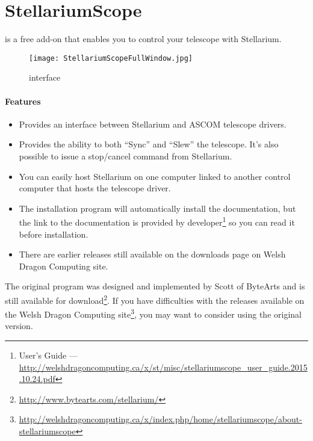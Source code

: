 


\newpage
\section{StellariumScope}
\label{sec:plugins:StellariumScope}
 is a free add-on that enables you to control your telescope with Stellarium. 

\begin{figure}[htp]
\begin{center}
\texttt{[image: StellariumScopeFullWindow.jpg]}
\end{center}
\caption{ interface}
\label{fig:StellariumScopeFullWindow}
\end{figure}


\paragraph{Features}
\begin{itemize}
\item Provides an interface between Stellarium and ASCOM telescope drivers.
\item Provides the ability to both ``Sync'' and ``Slew'' the
  telescope. It's also possible to issue a stop/cancel command from
  Stellarium.
\item You can easily host Stellarium on one computer linked to another
  control computer that hosts the telescope driver.
\item The installation program will automatically install the
  documentation, but the link to the documentation is provided
  by developer\footnote{ User's Guide --- \url{http://welshdragoncomputing.ca/x/st/misc/stellariumscope_user_guide.2015.10.24.pdf}} so you can read it before installation.
\item There are earlier releases still available on the downloads page on
  Welsh Dragon Computing site.
\end{itemize}

The original  program was designed and implemented by
Scott of ByteArts and is still available for
download\footnote{\url{http://www.bytearts.com/stellarium/}}. If you
have difficulties with the releases available on the Welsh Dragon
Computing
site\footnote{\url{http://welshdragoncomputing.ca/x/index.php/home/stellariumscope/about-stellariumscope}},
you may want to consider using the original version.


